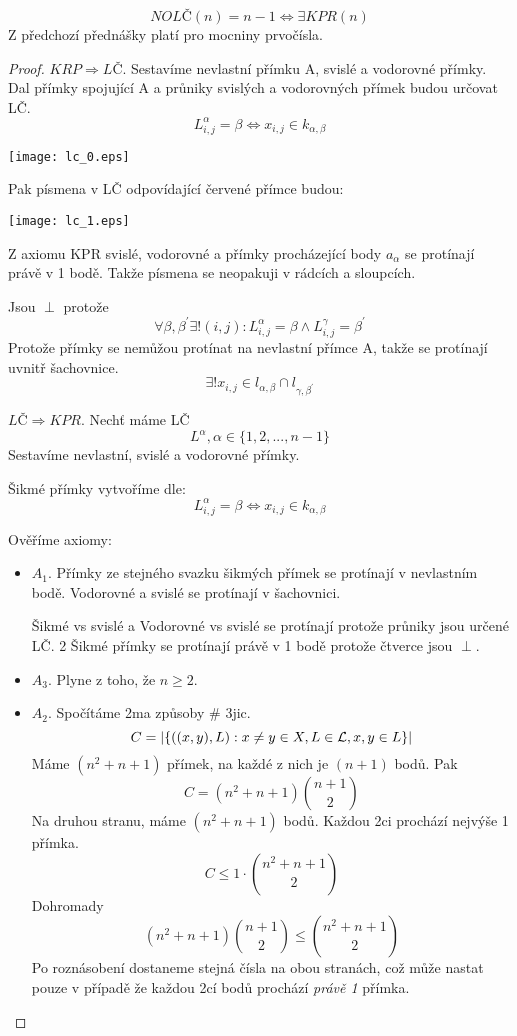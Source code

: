 \begin{theorem}\label{lc:nolc_kpr}
	\[ NOLČ(n) = n - 1 \iff \exists KPR(n) \]
	Z předchozí přednášky platí pro mocniny prvočísla.
\end{theorem}
\begin{proof}
	$KRP \Rightarrow LČ$. Sestavíme nevlastní přímku A, svislé a vodorovné přímky.
	Dal přímky spojující A a průniky svislých a vodorovných přímek budou určovat LČ.
	\[ L^{\alpha}_{i,j} = \beta \iff x_{i,j} \in k_{\alpha, \beta} \]

	\texttt{[image: lc\_0.eps]}

	Pak písmena v LČ odpovídající červené přímce budou:

	\texttt{[image: lc\_1.eps]}

	Z axiomu KPR svislé, vodorovné a přímky procházející body $a_{\alpha}$ se protínají právě v 1 bodě.
	Takže písmena se neopakuji v rádcích a sloupcích.

	Jsou $\perp$ protože
	\[ \forall \beta, \beta^{\prime} \exists ! (i, j): L^{\alpha}_{i, j} = \beta \land L^{\gamma}_{i,j} = \beta^{\prime} \]
	Protože přímky se nemůžou protínat na nevlastní přímce A, takže se protínají uvnitř šachovnice.
	\[ \exists ! x_{i, j} \in l_{\alpha, \beta} \cap l_{\gamma, \beta^{\prime}} \]

	$LČ \Rightarrow KPR$. Nechť máme LČ
	\[ L^{\alpha}, \alpha \in \{ 1, 2, ... ,n - 1 \} \]
	Sestavíme nevlastní, svislé a vodorovné přímky.

	Šikmé přímky vytvoříme dle:
	\[ L^{\alpha}_{i,j} = \beta \iff x_{i,j} \in k_{\alpha, \beta} \]

	Ověříme axiomy:
	\begin{itemize}
		\item $A_1$. Přímky ze stejného svazku šikmých přímek se protínají v nevlastním bodě.
			Vodorovné a svislé se protínají v šachovnici.

			Šikmé vs svislé a Vodorovné vs svislé se protínají protože průniky jsou určené LČ.
			2 Šikmé přímky se protínají právě v 1 bodě protože čtverce jsou $\perp$.
		\item $A_3$. Plyne z toho, že $n \geq 2$.
		\item $A_2$. Spočítáme 2ma způsoby \# 3jic.
			\[ C = |\{ ((x,y), L): x \ne y \in X, L \in \operatorname{\mathcal{L}}, x,y \in L \}| \]
			Máme $(n^2 + n + 1)$ přímek, na každé z nich je $(n + 1)$ bodů. Pak
			\[ C = (n^2 + n + 1) \binom{n + 1}{2} \]
			Na druhou stranu, máme $(n^2 + n + 1)$ bodů. Každou 2ci prochází nejvýše 1 přímka.
			\[ C \leq 1 \cdot \binom{n^2 + n + 1}{2} \]
			Dohromady
			\[ (n^2 + n + 1) \binom{n + 1}{2} \leq \binom{n^2 + n + 1}{2} \]
			Po roznásobení dostaneme stejná čísla na obou stranách, což může nastat pouze v případě že každou 2cí bodů prochází \emph{právě 1} přímka.
	\end{itemize}
\end{proof}

